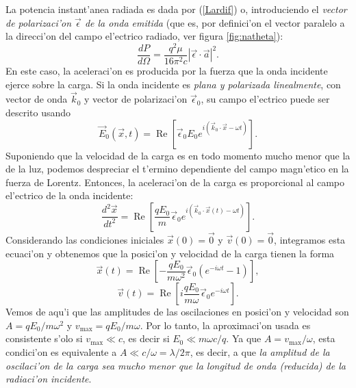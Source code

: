 La potencia instant'anea radiada es dada por (\ref{Lardif}) o, introduciendo el
\textit{vector de polarizaci'on $\vec{\epsilon}$ de la onda emitida} (que es, por definici'on el vector paralelo a la direcci'on del campo el'ectrico radiado, ver figura \ref{fig:natheta}):
\begin{equation}
\frac{dP}{d\Omega}=\frac{q^2\mu}{16\pi^2 c}|\vec{\epsilon}\cdot\vec{a}|^2.
\end{equation}
En este caso, la aceleraci'on es producida por la fuerza que la onda incidente ejerce sobre la carga. Si la onda incidente es \textit{plana y polarizada linealmente}, con vector de onda $\vec{k}_0$ y vector de polarizaci'on $\vec{\epsilon}_0$, su campo el'ectrico puede ser descrito usando
\begin{equation}
\vec{E}_0(\vec{x},t)=\operatorname{Re}\left[
\vec{\epsilon}_0E_0e^{i(\vec{k}_0\cdot\vec{x}-\omega t)}\right] .
\end{equation}
Suponiendo que la velocidad de la carga es en todo momento mucho menor que la de la
luz, podemos despreciar el t'ermino dependiente del campo magn'etico en la fuerza de Lorentz. Entonces, la aceleraci'on de la carga es proporcional al campo el'ectrico de la onda incidente:
\begin{equation}
\frac{d^2\vec{x}}{dt^2}
=\operatorname{Re}\left[\frac{qE_0}{m}\vec{\epsilon}_0e^{i(\vec{k}_0\cdot\vec{x}(t)
-\omega t)}\right] .
\end{equation}
Considerando las condiciones iniciales $\vec{x}(0)=\vec{0}$ y $\vec{v}(0)=\vec{0}$, integramos esta ecuaci'on y obtenemos que la posici'on y velocidad de la carga tienen la forma
\begin{equation}
\vec{x}(t)
=\operatorname{Re}\left[-\frac{qE_0}{m\omega^2}\vec{\epsilon}_0(e^{-i\omega t}-1)\right] ,
\end{equation}
\begin{equation}
\vec{v}(t)
=\operatorname{Re}\left[i\frac{qE_0}{m\omega}\vec{\epsilon}_0e^{-i\omega t}\right] .
\end{equation}
Vemos de aqu'i que las amplitudes de las oscilaciones en posici'on y velocidad son
$A={qE_0}/{m\omega^2}$ y $v_{\max}={qE_0}/{m\omega}$. Por lo
tanto, la aproximaci'on usada es consistente s'olo si $v_{\max}\ll c$, es decir si
$E_0\ll {m\omega c}/{q}$. Ya que $A={v_{\max}}/{\omega}$, esta condici'on
es equivalente a $A\ll c/\omega=\lambda/2\pi$, es decir, a que \textit{la amplitud de la oscilaci'on de la carga sea mucho menor que la longitud de onda (reducida) de la radiaci'on incidente}.

